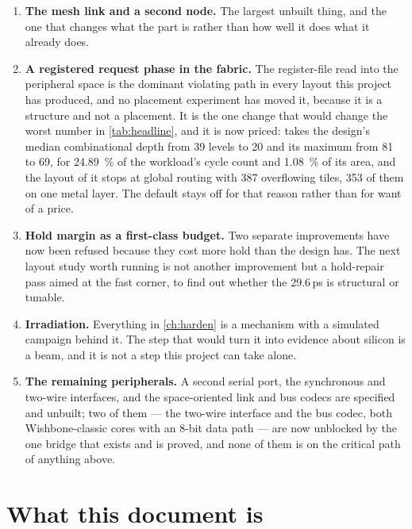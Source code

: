 \begin{enumerate}
\item \textbf{The mesh link and a second node.} The largest unbuilt
      thing, and the one that changes what the part is rather than how
      well it does what it already does.
\item \textbf{A registered request phase in the fabric.} The
      register-file read into the peripheral space is the dominant
      violating path in every layout this project has produced, and no
      placement experiment has moved it, because it is a structure and
      not a placement. It is the one change that would change the worst
      number in \cref{tab:headline}, and it is now priced: 
      takes the design's median combinational depth from 39 levels to 20
      and its maximum from 81 to 69, for \qty{24.89}{\percent} of the
      workload's cycle count and \qty{1.08}{\percent} of its area, and
      the layout of it stops at global routing with 387 overflowing
      tiles, 353 of them on one metal layer. The default stays off for
      that reason rather than for want of a price.
\item \textbf{Hold margin as a first-class budget.} Two separate
      improvements have now been refused because they cost more hold
      than the design has. The next layout study worth running is not
      another improvement but a hold-repair pass aimed at the fast
      corner, to find out whether the 29.6\,ps is structural or
      tunable.
\item \textbf{Irradiation.} Everything in \cref{ch:harden} is a
      mechanism with a simulated campaign behind it. The step that
      would turn it into evidence about silicon is a beam, and it is
      not a step this project can take alone.
\item \textbf{The remaining peripherals.} A second serial port, the
      synchronous and two-wire interfaces, and the space-oriented link
      and bus codecs are specified and unbuilt; two of them --- the
      two-wire interface and the bus codec, both Wishbone-classic
      cores with an 8-bit data path --- are now unblocked by the one
      bridge that exists and is proved, and none of them is on the
      critical path of anything above.
\end{enumerate}

\section{What this document is}

